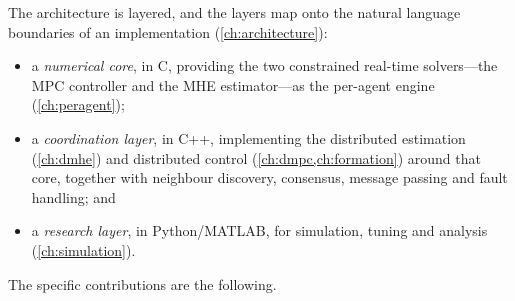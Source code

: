 The architecture is layered, and the layers map onto the natural language
boundaries of an implementation (\cref{ch:architecture}):
\begin{itemize}[nosep,leftmargin=1.4em]
  \item a \emph{numerical core}, in C, providing the two constrained real-time
        solvers---the MPC controller and the MHE estimator---as the per-agent
        engine (\cref{ch:peragent});
  \item a \emph{coordination layer}, in C++, implementing the distributed
        estimation (\cref{ch:dmhe}) and distributed control
        (\cref{ch:dmpc,ch:formation}) around that core, together with
        neighbour discovery, consensus, message passing and fault handling; and
  \item a \emph{research layer}, in Python/MATLAB, for simulation, tuning and
        analysis (\cref{ch:simulation}).
\end{itemize}
The specific contributions are the following.

